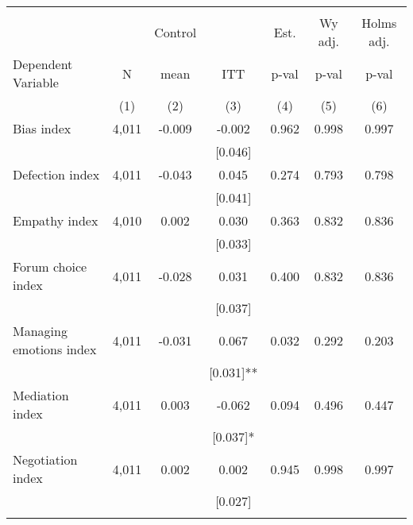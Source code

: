 \begin{tabular}{lcccccc}
\hline \noalign{\smallskip} &  &  &  &  &  & \\
 &  & Control &  & Est. & Wy adj. & Holms adj.\\
Dependent Variable & N & mean & ITT & p-val & p-val & p-val\\
 & (1) & (2) & (3) & (4) & (5) & (6)\\
\noalign{\smallskip}\hline \noalign{\smallskip}Bias index & 4,011 & -0.009 & -0.002 & 0.962 & 0.998 & 0.997\\
 &  &  & [0.046] &  &  & \\
Defection index & 4,011 & -0.043 & 0.045 & 0.274 & 0.793 & 0.798\\
 &  &  & [0.041] &  &  & \\
Empathy index & 4,010 & 0.002 & 0.030 & 0.363 & 0.832 & 0.836\\
 &  &  & [0.033] &  &  & \\
Forum choice index & 4,011 & -0.028 & 0.031 & 0.400 & 0.832 & 0.836\\
 &  &  & [0.037] &  &  & \\
Managing emotions index & 4,011 & -0.031 & 0.067 & 0.032 & 0.292 & 0.203\\
 &  &  & [0.031]** &  &  & \\
Mediation index & 4,011 & 0.003 & -0.062 & 0.094 & 0.496 & 0.447\\
 &  &  & [0.037]* &  &  & \\
Negotiation index & 4,011 & 0.002 & 0.002 & 0.945 & 0.998 & 0.997\\
 &  &  & [0.027] &  &  & \\
\noalign{\smallskip}\hline\end{tabular}
